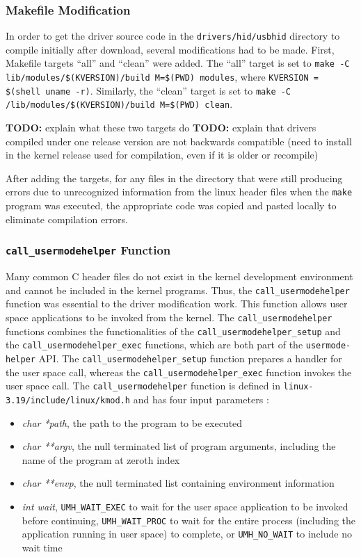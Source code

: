\documentclass[pagenumbers]{ieee}
\begin{document}
\subsubsection{Makefile Modification}

In order to get the driver source code in the \texttt{drivers/hid/usbhid} directory to compile initially after download, several modifications had to be made. First, Makefile targets ``all'' and ``clean'' were added. The ``all'' target is set to \texttt{make -C lib/modules/\$(KVERSION)/build M=\$(PWD) modules}, where \texttt{KVERSION = \$(shell uname -r)}. Similarly, the ``clean'' target is set to \texttt{make -C /lib/modules/\$(KVERSION)/build M=\$(PWD) clean}. 

\textbf{TODO:} explain what these two targets do  
\textbf{TODO:} explain that drivers compiled under one release version are not backwards compatible (need to install in the kernel release used for compilation, even if it is older or recompile)

After adding the targets, for any files in the directory that were still producing errors due to unrecognized information from the linux header files when the \texttt{make} program was executed, the appropriate code was copied and pasted locally to eliminate compilation errors.

\subsubsection{\texttt{call\_usermodehelper} Function}

Many common C header files do not exist in the kernel development environment and cannot be included in the kernel programs. Thus, the \texttt{call\_usermodehelper} function was essential to the driver modification work. This function allows user space applications to be invoked from the kernel. The \texttt{call\_usermodehelper} functions combines the functionalities of the \texttt{call\_usermodehelper\_setup} and the \texttt{call\_usermodehelper\_exec} functions, which are both part of the \texttt{usermode-helper} API. The \texttt{call\_usermodehelper\_setup} function prepares a handler for the user space call, whereas the \texttt{call\_usermodehelper\_exec} function invokes the user space call. The \texttt{call\_usermodehelper} function is defined in \texttt{linux-3.19/include/linux/kmod.h} and has four input parameters \cite{ibm}:
\begin{itemize}
\item \textit{char *path}, the path to the program to be executed
\item \textit{char **argv}, the null terminated list of program arguments, including the name of the program at zeroth index
\item \textit{char **envp}, the null terminated list containing environment information 
\item \textit{int wait}, \texttt{UMH\_WAIT\_EXEC} to wait for the user space application to be invoked before continuing, \texttt{UMH\_WAIT\_PROC} to wait for the entire process (including the application running in user space) to complete, or \texttt{UMH\_NO\_WAIT} to include no wait time
\end{itemize}
\end{document}
